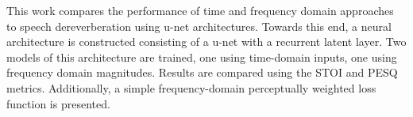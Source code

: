 This work compares the performance of time and frequency domain approaches to speech dereverberation using u-net architectures. Towards this end, a neural architecture is constructed consisting of a u-net with a recurrent latent layer. Two models of this architecture are trained, one using time-domain inputs, one using frequency domain magnitudes. Results are compared using the \ac{STOI} and \ac{PESQ} metrics. Additionally, a simple frequency-domain perceptually weighted loss function is presented.
